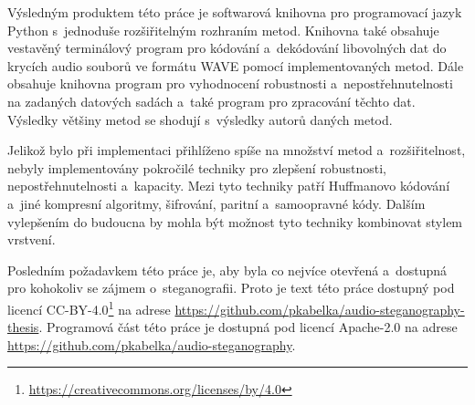 Výsledným produktem této práce je softwarová knihovna pro programovací jazyk
Python s~jednoduše rozšiřitelným rozhraním metod. Knihovna také obsahuje
vestavěný terminálový program pro kódování a~dekódování libovolných dat do
krycích audio souborů ve formátu WAVE pomocí implementovaných metod. Dále
obsahuje knihovna program pro vyhodnocení robustnosti a~nepostřehnutelnosti na
zadaných datových sadách a~také program pro zpracování těchto dat. Výsledky
většiny metod se shodují s~výsledky autorů daných metod.

Jelikož bylo při implementaci přihlíženo spíše na množství metod
a~rozšiřitelnost, nebyly implementovány pokročilé techniky pro zlepšení
robustnosti, nepostřehnutelnosti a~kapacity. Mezi tyto techniky patří
Huffmanovo kódování a~jiné kompresní algoritmy, šifrování, paritní
a~samoopravné kódy. Dalším vylepšením do budoucna by mohla být možnost tyto
techniky kombinovat stylem vrstvení.

Posledním požadavkem této práce je, aby byla co nejvíce otevřená a~dostupná pro
kohokoliv se zájmem o~steganografii. Proto je text této práce dostupný pod
licencí CC-BY-4.0\footnote{\url{https://creativecommons.org/licenses/by/4.0}}
na adrese \url{https://github.com/pkabelka/audio-steganography-thesis}.
Programová část této práce je dostupná pod licencí Apache-2.0 na adrese
\url{https://github.com/pkabelka/audio-steganography}.
